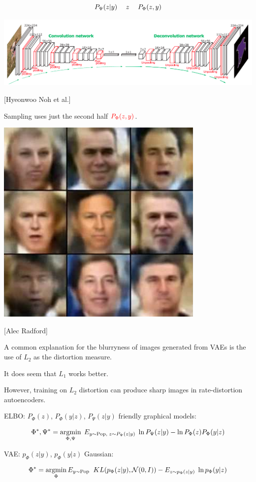 {

$$P_\Psi(z|y) \hspace{3ex} z \hspace{3ex} P_\Phi(z,y)$$

\centerline{\includegraphics[width=6in]{../images/Deconv}}
\centerline{\large [Hyeonwoo Noh et al.]}

\vfill
Sampling uses just the second half ${\color{red} P_\Phi(z,y)}$.


\vfill
\centerline{\includegraphics[width = 4in]{../images/VariationalFaces}}
\centerline{[Alec Radford]}


A common explanation for the blurryness of images generated from VAEs
is the use of $L_2$ as the distortion measure.

\vfill
It does seem that $L_1$ works better.

\vfill
However, training on $L_2$ distortion can produce sharp images in
rate-distortion autoencoders.



ELBO: {\color{red} $P_\Phi(z)$, $P_\Phi(y|z)$, $P_\Psi(z|y)$} friendly graphical models:

{\color{red} $$\Phi^*,\Psi^*  =  \operatorname*{argmin}_{\Phi,\Psi}\; E_{y \sim \mathrm{Pop},\;z \sim P_\Psi(z|y)} \;\ln P_\Psi(z|y) - \ln P_\Phi(z)P_\Phi(y|z)$$}

\vfill
VAE: {\color{red} $p_\Phi(z|y)$, $p_\Phi(y|z)$} Gaussian:

{\color{red} $$\Phi^* =  \operatorname*{argmin}_\Phi E_{y \sim \mathrm{Pop}}\; \;KL(p_\Phi(z|y),{\cal N}(0,I))  - E_{z\sim p_\Phi(z|y)}\;\ln p_\Phi(y|z)$$}


}



